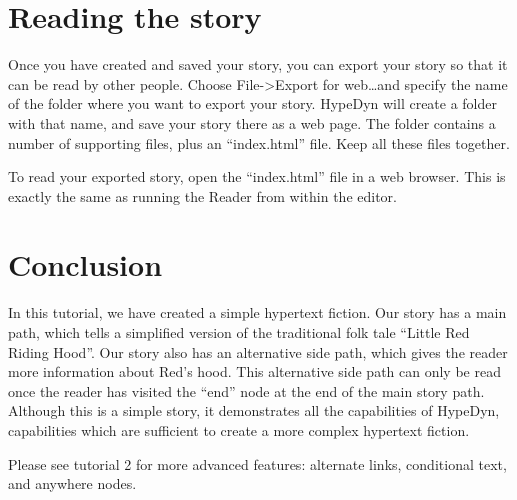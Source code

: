 \documentclass{article}
\begin{document}
\section{Reading the story}

Once you have created and saved your story, you can export your story so that it
can be read by other people. Choose File->Export for web\ldots and specify the
name of the folder where you want to export your story. HypeDyn will create a
folder with that name, and save your story there as a web page. The folder
contains a number of supporting files, plus an ``index.html'' file. Keep all
these files together.

To read your exported story, open the ``index.html'' file in a web browser. This
is exactly the same as running the Reader from within the editor.

\section{Conclusion}

In this tutorial, we have created a simple hypertext fiction. Our story has a
main path, which tells a simplified version of the traditional folk tale
``Little Red Riding Hood''. Our story also has an alternative side path, which
gives the reader more information about Red's hood. This alternative side path
can only be read once the reader has visited the ``end'' node at the end of the
main story path. Although this is a simple story, it demonstrates all the
capabilities of HypeDyn, capabilities which are sufficient to create a more
complex hypertext fiction.



Please see tutorial 2 for more advanced features: alternate links, conditional
text, and anywhere nodes.
\end{document}
